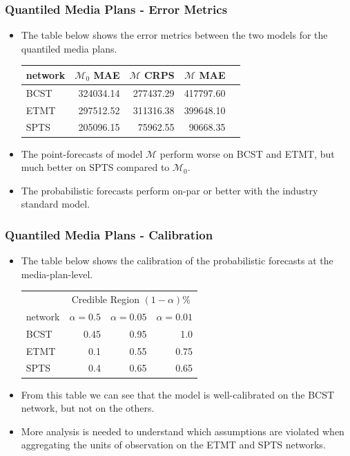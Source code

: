 \documentclass{beamer}
\begin{document}
\begin{frame}
  \frametitle{Quantiled Media Plans - Error Metrics}
  \begin{itemize}
    \item
      The table below shows the error metrics between the two models for the quantiled media plans.
    \begin{table}[h!]
      \centering
        \begin{tabular}{lrrrr}
          network  & $\mathcal{M}_0$ MAE & $\mathcal{M}$ CRPS & $\mathcal{M}$ MAE \\
          \hline
          BCST & 324034.14 & 277437.29 & 417797.60 \\
          ETMT & 297512.52 & 311316.38 & 399648.10 \\
          SPTS & 205096.15 & 75962.55 & 90668.35
        \end{tabular}
    \end{table}
    \pause
    \item The point-forecasts of model $\mathcal{M}$ perform worse on BCST and ETMT, but much better
      on SPTS compared to $\mathcal{M}_0$.
      \pause
    \item The probabilistic forecasts perform on-par or better with the industry standard model.
    \end{itemize}
\end{frame}

\begin{frame}
\frametitle{Quantiled Media Plans - Calibration}
\begin{itemize}
\item The table below shows the calibration of the probabilistic forecasts at the media-plan-level.
    \begin{table}
      \centering
        \begin{tabular}{lrrr}
          & \multicolumn{3}{c}{Credible Region $(1 - \alpha)\%$} \\
          network & $\alpha = 0.5$ & $\alpha = 0.05$ & $\alpha = 0.01$ \\
          \hline
          BCST & 0.45 & 0.95 & 1.0 \\
          ETMT & 0.1 & 0.55  & 0.75 \\
          SPTS & 0.4 & 0.65 & 0.65 \\
        \end{tabular}
    \end{table}
\pause
\item From this table we can see that the model is well-calibrated on the BCST network, but not on the others.
\pause
\item More analysis is needed to understand which assumptions are violated when aggregating the units of observation
on the ETMT and SPTS networks.
\end{itemize}
\end{frame}
\end{document}
